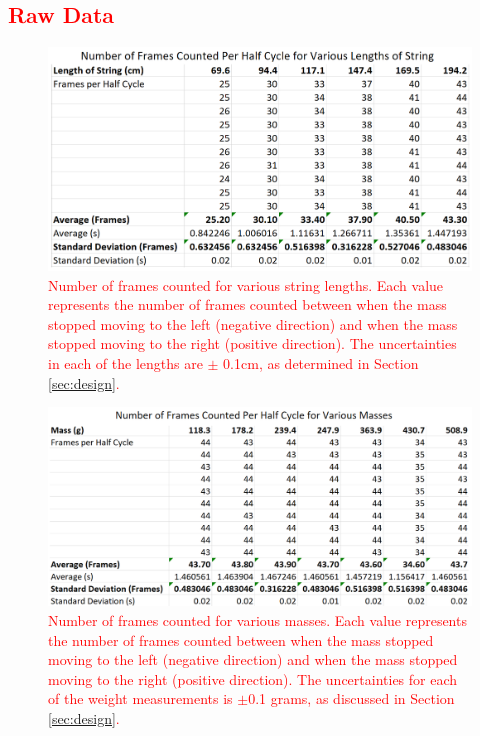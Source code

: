 \documentclass[11pt]{article}
\begin{document}
    \subsection{\textcolor{red}{Raw Data}}\label{app:RawData}

    \begin{figure}[H]
        \includegraphics[width = \textwidth]{RawStringLengths.PNG}
        \caption{\textcolor{red}
        {Number of frames counted for various string lengths. Each value represents the number of frames counted between when the mass stopped moving to the left (negative direction) and when the mass stopped moving to the right (positive direction). The uncertainties in each of the lengths are $\pm$ 0.1cm, as determined in Section \ref{sec:design}.}
        \label{fig:RawStringLengths}
        }   
    \end{figure}
    
    \begin{figure}[H]
        \includegraphics[width = \textwidth]{RawMasses.PNG}
        \caption{\textcolor{red}
        {Number of frames counted for various masses. Each value represents the number of frames counted between when the mass stopped moving to the left (negative direction) and when the mass stopped moving to the right (positive direction). The uncertainties for each of the weight measurements is $\pm$0.1 grams, as discussed in Section \ref{sec:design}.}
        \label{fig:RawMasses}
        }   
    \end{figure}


    
    
\end{document}
